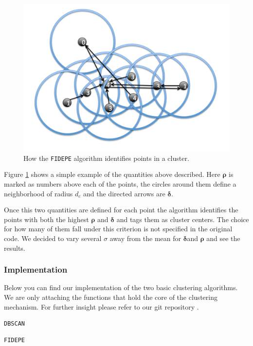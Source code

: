 \documentclass[12pt]{article}
\begin{document}
\begin{figure}[ht]
\centering
\includegraphics[width=0.8\linewidth]{../plots/fidepe/FIDEPE}
\caption{How the \texttt{FIDEPE} algorithm identifies points in a cluster.}
\label{fig:FIDEPE}
\end{figure}


Figure \ref{fig:FIDEPE} shows a simple example of the quantities above described. Here $\boldsymbol{\rho}$ is marked as numbers above each of the points, the circles around them define a neighborhood of radius $d_c$ and the directed arrows are $\boldsymbol{\delta}$.


Once this two quantities are defined for each point the algorithm identifies the points with both the highest $\boldsymbol{\rho}$ and $\boldsymbol{\delta}$ and tags them as cluster centers. The choice for how many of them fall under this criterion is not specified in the original code. We decided to vary several $\sigma$ away from the mean for $\boldsymbol{\delta}$and $\boldsymbol{\rho}$ and see the results.
\subsubsection{Implementation}

Below you can find our implementation of the two basic clustering algorithms. We are only attaching the functions that hold the core of the clustering mechanism. For further insight please refer to our git repository \cite{git}. 

\begin{center}
\texttt{DBSCAN}
\end{center}

\singlespacing



\begin{center}
\texttt{FIDEPE}
\end{center}
\end{document}
